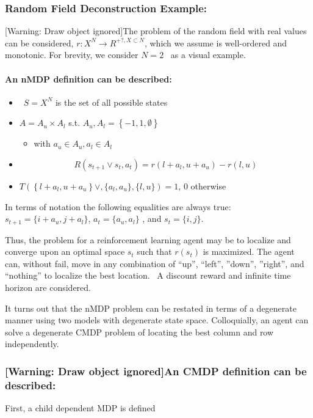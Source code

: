 \documentclass{article}
\begin{document}
\subsubsection{Random Field Deconstruction Example:}
[Warning: Draw object ignored]The problem of the random field with real values can be considered,  $r:X^N\rightarrow R^{+?,X{\subset}N}$, which we assume is well-ordered and monotonic. For brevity, we consider  $N=2$ \ as a visual example.

\paragraph[An nMDP definition can be described:]{An nMDP definition can be described:}
\begin{itemize}
\item \  $S=X^N$ is the set of all possible states
\item  $A=A_u\times A_l$ s.t.  $A_u,A_l=\left\{-1,1,{\emptyset}\right\}$

\begin{itemize}
\item with  $a_u{\in}A_u,a_l{\in}A_l$ 
\end{itemize}
\item \begin{equation*}
R\left(s_{t+1}\vee s_t,a_t\right)=r\left(l+a_l,u+a_u\right)-r(l,u)
\end{equation*}
\item  $T\left(\left\{l+a_l,u+a_u\right\}\vee ,\{a_l,a_u\},\{l,u\}\right)=1$,  $0$ otherwise
\end{itemize}
In terms of notation the following equalities are always true:  $s_{t+1}=\{i+a_u,j+a_l\}$, $a_t=\{a_u,a_l\}$ , and $s_t=\{i,j\}$.

Thus, the problem for a reinforcement learning agent may be to localize and converge upon an optimal space  $s_t$ such that  $r(s_t)$ is maximized. The agent can, without fail, move in any combination of ``up'', ``left'', ''down'', ''right'', and ``nothing'' to localize the best location. \ A discount reward and infinite time horizon are considered.

It turns out that the nMDP problem can be restated in terms of a degenerate manner using two models with degenerate state space. Colloquially, an agent can solve a degenerate CMDP problem of locating the best column and row independently.

\subsubsection[An CMDP definition can be described:]{[Warning: Draw object ignored]An CMDP definition can be described:}
First, a child dependent MDP is defined
\end{document}

